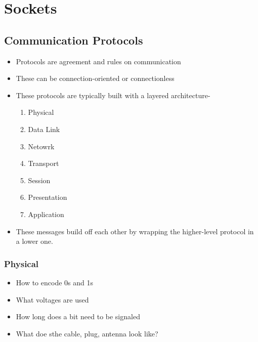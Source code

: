 \section{Sockets}\label{sec:Sockets}
\subsection{Communication Protocols}\label{subsec:Communication_Protocols}
\begin{itemize}
\item Protocols are agreement and rules on communication
\item These can be connection-oriented or connectionless
\item These protocols are typically built with a layered architecture-
\begin{enumerate}
\item Physical
\item Data Link
\item Netowrk
\item Transport
\item Session
\item Presentation
\item Application
\end{enumerate}
\item These messages build off each other by wrapping the higher-level protocol in a lower one.
\end{itemize}

\subsubsection{Physical}\label{subsubsec:Physical_Protocols}
\begin{itemize}
\item How to encode 0s and 1s
\item What voltages are used
\item How long does a bit need to be signaled
\item What doe sthe cable, plug, antenna look like?
\end{itemize}


